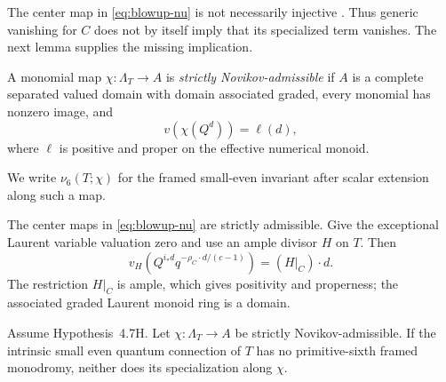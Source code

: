 The center map in \eqref{eq:blowup-nu} is not necessarily injective
\cite[(5.15)]{IritaniBlowup}.  Thus generic vanishing for \(C\) does not by
itself imply that its specialized term vanishes.  The next lemma supplies the
missing implication.

\begin{definition}
\label{def:strict-novikov-admissible}
A monomial map \(\chi:\Lambda_T\to A\) is \emph{strictly
Novikov-admissible} if \(A\) is a complete separated valued domain with domain
associated graded, every monomial has nonzero image, and
\[
 v(\chi(Q^d))=\ell(d),
 \tag{4.5}
 \label{eq:strict-novikov-valuation}
\]
where \(\ell\) is positive and proper on the effective numerical monoid.
\end{definition}

We write \(\nu_6(T;\chi)\) for the framed small-even invariant after scalar
extension along such a map.

The center maps in \eqref{eq:blowup-nu} are strictly admissible.  Give the exceptional
Laurent variable valuation zero and use an ample divisor \(H\) on \(T\).  Then
\[
 v_H\!\left(Q^{i_*d}q^{-\rho_C\cdot d/(c-1)}\right)
 =(H|_C)\cdot d.
\]
The restriction \(H|_C\) is ample, which gives positivity and properness; the
associated graded Laurent monoid ring is a domain.

\begin{lemma}
\label{lem:divisor-tagging}
Assume Hypothesis~4.7H.
Let \(\chi:\Lambda_T\to A\) be strictly Novikov-admissible.  If the intrinsic
small even quantum connection of \(T\) has no primitive-sixth framed
monodromy, neither does its specialization along \(\chi\).
\end{lemma}

